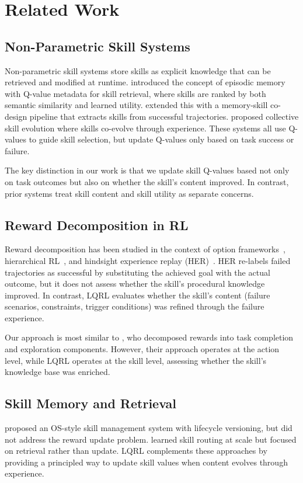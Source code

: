 \section{Related Work}
\label{sec:related}

\subsection{Non-Parametric Skill Systems}

Non-parametric skill systems store skills as explicit knowledge that can be retrieved and modified at runtime. \citet{memrl} introduced the concept of episodic memory with Q-value metadata for skill retrieval, where skills are ranked by both semantic similarity and learned utility. \citet{memskill} extended this with a memory-skill co-design pipeline that extracts skills from successful trajectories. \citet{skillclaw} proposed collective skill evolution where skills co-evolve through experience. These systems all use Q-values to guide skill selection, but update Q-values only based on task success or failure.

The key distinction in our work is that we update skill Q-values based not only on task outcomes but also on whether the skill's content improved. In contrast, prior systems treat skill content and skill utility as separate concerns.

\subsection{Reward Decomposition in RL}

Reward decomposition has been studied in the context of option frameworks~\citep{options}, hierarchical RL~\citep{hiroptions}, and hindsight experience replay (HER)~\citep{her}. HER re-labels failed trajectories as successful by substituting the achieved goal with the actual outcome, but it does not assess whether the skill's procedural knowledge improved. In contrast, LQRL evaluates whether the skill's content (failure scenarios, constraints, trigger conditions) was refined through the failure experience.

Our approach is most similar to \citet{sparse reward rl}, who decomposed rewards into task completion and exploration components. However, their approach operates at the action level, while LQRL operates at the skill level, assessing whether the skill's knowledge base was enriched.

\subsection{Skill Memory and Retrieval}

\citet{skillos} proposed an OS-style skill management system with lifecycle versioning, but did not address the reward update problem. \citet{skillrouter} learned skill routing at scale but focused on retrieval rather than update. LQRL complements these approaches by providing a principled way to update skill values when content evolves through experience.
